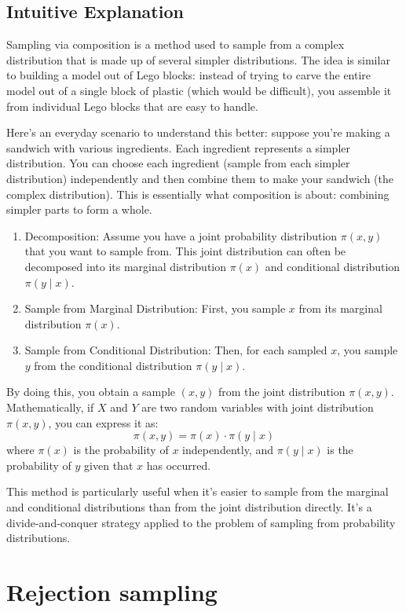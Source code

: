 \documentclass{article}
\begin{document}
\subsection{Intuitive Explanation}
Sampling via composition is a method used to sample from a complex distribution that is made up of several simpler distributions. The idea is similar to building a model out of Lego blocks: instead of trying to carve the entire model out of a single block of plastic (which would be difficult), you assemble it from individual Lego blocks that are easy to handle.

Here's an everyday scenario to understand this better: suppose you're making a sandwich with various ingredients. Each ingredient represents a simpler distribution. You can choose each ingredient (sample from each simpler distribution) independently and then combine them to make your sandwich (the complex distribution). This is essentially what composition is about: combining simpler parts to form a whole.
\begin{enumerate}
    \item Decomposition: Assume you have a joint probability distribution $\pi(x, y)$ that you want to sample from. This joint distribution can often be decomposed into its marginal distribution $\pi(x)$ and conditional distribution $\pi(y \mid x)$.
    \item Sample from Marginal Distribution: First, you sample $x$ from its marginal distribution $\pi(x)$.
    \item Sample from Conditional Distribution: Then, for each sampled $x$, you sample $y$ from the conditional distribution $\pi(y \mid x)$.
\end{enumerate}

By doing this, you obtain a sample $(x, y)$ from the joint distribution $\pi(x, y)$. Mathematically, if $X$ and $Y$ are two random variables with joint distribution $\pi(x, y)$, you can express it as:
$$
\pi(x, y)=\pi(x) \cdot \pi(y \mid x)
$$
where $\pi(x)$ is the probability of $x$ independently, and $\pi(y \mid x)$ is the probability of $y$ given that $x$ has occurred.

This method is particularly useful when it's easier to sample from the marginal and conditional distributions than from the joint distribution directly. It's a divide-and-conquer strategy applied to the problem of sampling from probability distributions.

\section{Rejection sampling}
\end{document}
